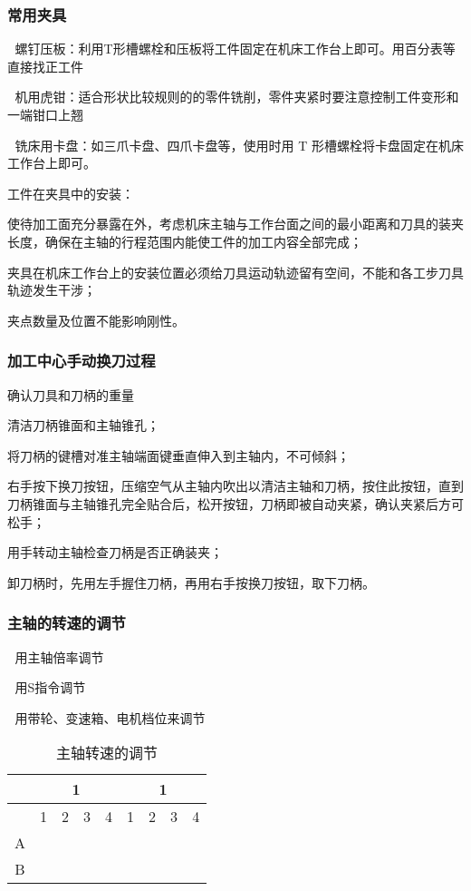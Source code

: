 \subsubsection{常用夹具}

	螺钉压板：利用T形槽螺栓和压板将工件固定在机床工作台上即可。用百分表等直接找正工件

	机用虎钳：适合形状比较规则的的零件铣削，零件夹紧时要注意控制工件变形和一端钳口上翘

	铣床用卡盘：如三爪卡盘、四爪卡盘等，使用时用 T 形槽螺栓将卡盘固定在机床工作台上即可。

工件在夹具中的安装：

	使待加工面充分暴露在外，考虑机床主轴与工作台面之间的最小距离和刀具的装夹长度，确保在主轴的行程范围内能使工件的加工内容全部完成； 

	夹具在机床工作台上的安装位置必须给刀具运动轨迹留有空间，不能和各工步刀具轨迹发生干涉； 

	夹点数量及位置不能影响刚性。

\subsubsection{加工中心手动换刀过程}
确认刀具和刀柄的重量 

清洁刀柄锥面和主轴锥孔； 

将刀柄的键槽对准主轴端面键垂直伸入到主轴内，不可倾斜； 

右手按下换刀按钮，压缩空气从主轴内吹出以清洁主轴和刀柄，按住此按钮，直到刀柄锥面与主轴锥孔完全贴合后，松开按钮，刀柄即被自动夹紧，确认夹紧后方可松手； 

用手转动主轴检查刀柄是否正确装夹； 

卸刀柄时，先用左手握住刀柄，再用右手按换刀按钮，取下刀柄。 

\subsubsection{主轴的转速的调节} 

	用主轴倍率调节

	用S指令调节

	用带轮、变速箱、电机档位来调节



\begin{table}
		\caption{主轴转速的调节}
		\centering
	\begin{tabular}{|c|c|c|c|c|c|c|c|c|}
		\hline 
		&  \multicolumn{4}{|c|}{1}& \multicolumn{4}{|c|}{1} \\ 
		\hline 
		& 1 & 2 & 3 & 4 & 1 & 2 & 3 & 4 \\ 
		\hline 
		A&  &  &  &  &  &  &  &  \\ 
		\hline 
		B&  &  &  &  &  &  &  &  \\ 
		\hline 
	\end{tabular} 
\end{table}

